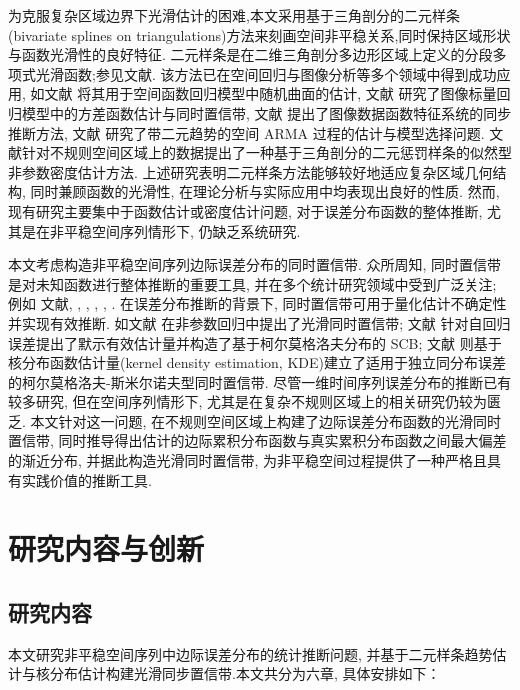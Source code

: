 \documentclass[a4paper,openay,14pt]{ctexbook}
\numberwithin{equation}{section}
\numberwithin{lem}{section}
\begin{document}
为克服复杂区域边界下光滑估计的困难,本文采用基于三角剖分的二元样条(bivariate splines on triangulations)方法来刻画空间非平稳关系,同时保持区域形状与函数光滑性的良好特征. 二元样条是在二维三角剖分多边形区域上定义的分段多项式光滑函数;参见文献\cite{lai2013bivariate}. 该方法已在空间回归与图像分析等多个领域中得到成功应用, 如文献\cite{guillas2010bivariate} 将其用于空间函数回归模型中随机曲面的估计, 文献\cite{yu2021multivariate} 研究了图像标量回归模型中的方差函数估计与同时置信带, 文献\cite{hu2024statistical} 提出了图像数据函数特征系统的同步推断方法, 文献\cite{zhang2025oracally} 研究了带二元趋势的空间 ARMA 过程的估计与模型选择问题. 文献\cite{das2025nonparametric}针对不规则空间区域上的数据提出了一种基于三角剖分的二元惩罚样条的似然型非参数密度估计方法. 上述研究表明二元样条方法能够较好地适应复杂区域几何结构, 同时兼顾函数的光滑性, 在理论分析与实际应用中均表现出良好的性质. 然而, 现有研究主要集中于函数估计或密度估计问题, 对于误差分布函数的整体推断, 尤其是在非平稳空间序列情形下, 仍缺乏系统研究.

本文考虑构造非平稳空间序列边际误差分布的同时置信带. 众所周知, 同时置信带是对未知函数进行整体推断的重要工具, 并在多个统计研究领域中受到广泛关注; 例如
文献\cite{wang2013smooth}, \cite{gu2014simultaneous}, \cite{wang2014oracally}, \cite{cao2016oracle}, \cite{zhang2018smooth}, \cite{wang2022oracle}.
在误差分布推断的背景下, 同时置信带可用于量化估计不确定性并实现有效推断. 如文献\cite{gu2021smooth} 在非参数回归中提出了光滑同时置信带; 文献\cite{wang2014oracally} 针对自回归误差提出了默示有效估计量并构造了基于柯尔莫格洛夫分布的 SCB; 文献\cite{wang2022oracle} 则基于核分布函数估计量(kernel density estimation, KDE)建立了适用于独立同分布误差的柯尔莫格洛夫-斯米尔诺夫型同时置信带. 尽管一维时间序列误差分布的推断已有较多研究, 但在空间序列情形下, 尤其是在复杂不规则区域上的相关研究仍较为匮乏. 本文针对这一问题, 在不规则空间区域上构建了边际误差分布函数的光滑同时置信带, 同时推导得出估计的边际累积分布函数与真实累积分布函数之间最大偏差的渐近分布, 并据此构造光滑同时置信带, 为非平稳空间过程提供了一种严格且具有实践价值的推断工具.


\section{研究内容与创新}
\subsection{研究内容}
本文研究非平稳空间序列中边际误差分布的统计推断问题,  并基于二元样条趋势估计与核分布估计构建光滑同步置信带.本文共分为六章, 具体安排如下：
\end{document}
